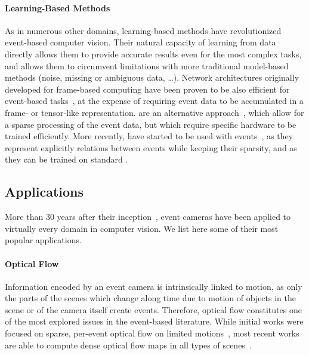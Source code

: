 \paragraph{Learning-Based Methods}
As in numerous other domains, learning-based methods have revolutionized event-based computer vision. Their natural capacity of learning from data directly allows them to provide accurate results even for the most complex tasks, and allows them to circumvent limitations with more traditional model-based methods (noise, missing or ambiguous data, \dots). Network architectures originally developed for frame-based computing have been proven to be also efficient for event-based tasks~\cite{Zhu2018EVFlowNetSO,Gehrig2021CombiningEA}, at the expense of requiring event data to be accumulated in a frame- or tensor-like representation.  are an alternative approach~\cite{ParedesValls2021SelfSupervisedLO,Ranon2021StereoSpikeDL}, which allow for a sparse processing of the event data, but which require specific hardware to be trained efficiently. More recently,  have started to be used with events~\cite{Alkendi2021NeuromorphicCD,Schaefer2022AEGNNAE}, as they represent explicitly relations between events while keeping their sparsity, and as they can be trained on standard .


\subsection{Applications}
More than 30 years after their inception~\cite{Mahowald1991TheSR,Mahowald1992VLSIAO}, event cameras have been applied to virtually every domain in computer vision. We list here some of their most popular applications.

\paragraph{Optical Flow}
Information encoded by an event camera is intrinsically linked to motion, as only the parts of the scenes which change along time due to motion of objects in the scene or of the camera itself create events. Therefore, optical flow constitutes one of the most explored issues in the event-based literature. While initial works were focused on sparse, per-event optical flow on limited motions~\cite{Benosman2014EventBasedVF,Stoffregen2017SimultaneousOF}, most recent works are able to compute dense optical flow maps in all types of scenes~\cite{Gehrig2021DenseOF,Liu2023TMATM}.

